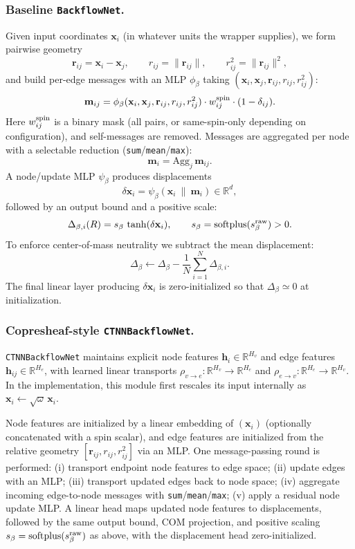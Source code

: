 \documentclass[superscriptaddress,unsortedaddress,amsmath,amssymb,aps]{revtex4-2}
\begin{document}
\subsubsection{Baseline \texttt{BackflowNet}.}
Given input coordinates $\mathbf x_i$ (in whatever units the wrapper supplies), we form pairwise geometry
\[
  \mathbf r_{ij}=\mathbf x_i-\mathbf x_j,\qquad
  r_{ij}=\|\mathbf r_{ij}\|,\qquad
  r_{ij}^2=\|\mathbf r_{ij}\|^2,
\]
and build per-edge messages with an MLP $\phi_\beta$ taking $(\mathbf x_i,\mathbf x_j,\mathbf r_{ij},r_{ij},r_{ij}^2)$:
\begin{equation}
  \mathbf m_{ij}=\phi_\beta(\mathbf x_i,\mathbf x_j,\mathbf r_{ij},r_{ij},r_{ij}^2)\cdot w_{ij}^{\rm spin}\cdot(1-\delta_{ij}).
\end{equation}
Here $w_{ij}^{\rm spin}$ is a binary mask (all pairs, or same-spin-only depending on configuration), and self-messages are removed.
Messages are aggregated per node with a selectable reduction (\texttt{sum}/\texttt{mean}/\texttt{max}):
\[
  \mathbf m_i=\mathrm{Agg}_{j}\,\mathbf m_{ij}.
\]
A node/update MLP $\psi_\beta$ produces displacements
\[
  \delta\mathbf x_i=\psi_\beta(\mathbf x_i\ \|\ \mathbf m_i)\in\mathbb R^d,
\]
followed by an output bound and a positive scale:
\begin{equation}
  \Delta_{\beta,i}(R)= s_\beta\,\tanh(\delta\mathbf x_i),
  \qquad
  s_\beta=\mathrm{softplus}(s_\beta^{\rm raw})>0.
\end{equation}
To enforce center-of-mass neutrality we subtract the mean displacement:
\[
  \Delta_\beta \leftarrow \Delta_\beta - \frac{1}{N}\sum_{i=1}^N \Delta_{\beta,i}.
\]
The final linear layer producing $\delta\mathbf x_i$ is zero-initialized so that $\Delta_\beta\simeq 0$ at initialization.

\subsubsection{Copresheaf-style \texttt{CTNNBackflowNet}.}
\texttt{CTNNBackflowNet} maintains explicit node features $\mathbf h_i\in\mathbb R^{H_v}$ and edge features
$\mathbf h_{ij}\in\mathbb R^{H_e}$, with learned linear transports
$\rho_{v\to e}:\mathbb R^{H_v}\to\mathbb R^{H_e}$ and $\rho_{e\to v}:\mathbb R^{H_e}\to\mathbb R^{H_v}$.
In the implementation, this module first rescales its input internally as $\mathbf x_i\leftarrow \sqrt{\omega}\,\mathbf x_i$.

Node features are initialized by a linear embedding of $(\mathbf x_i)$ (optionally concatenated with a spin scalar),
and edge features are initialized from the relative geometry $[\mathbf r_{ij},r_{ij},r_{ij}^2]$ via an MLP.
One message-passing round is performed:
(i) transport endpoint node features to edge space; (ii) update edges with an MLP;
(iii) transport updated edges back to node space; (iv) aggregate incoming edge-to-node messages with
\texttt{sum}/\texttt{mean}/\texttt{max}; (v) apply a residual node update MLP.
A linear head maps updated node features to displacements, followed by the same output bound, COM projection,
and positive scaling $s_\beta=\mathrm{softplus}(s_\beta^{\rm raw})$ as above, with the displacement head zero-initialized.
\end{document}
